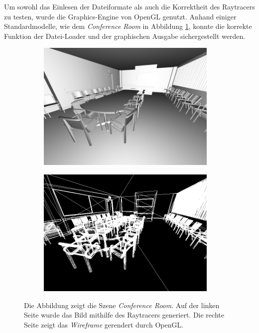 \documentclass[crop=false]{standalone}
\begin{document}
      Um sowohl das Einlesen der Dateiformate als auch die Korrektheit des Raytracers zu testen, wurde die Graphics-Engine von OpenGL genutzt.
      Anhand einiger Standardmodelle, wie dem \textit{Conference Room} in Abbildung \ref{fig:raytracer-example}, konnte die korrekte Funktion der Datei-Loader und der graphischen Ausgabe sichergestellt werden.
      \begin{figure}
        \center
        \begin{subfigure}[b]{0.49\textwidth}
          \center
          \includegraphics[width=0.95\textwidth]{images/ray_tracer_example.png}
        \end{subfigure}
        \begin{subfigure}[b]{0.49\textwidth}
          \center
          \includegraphics[width=0.95\textwidth]{images/opengl_example.png}
        \end{subfigure}
        \caption{%
          Die Abbildung zeigt die Szene \textit{Conference Room}.
          Auf der linken Seite wurde das Bild mithilfe des Raytracers generiert.
          Die rechte Seite zeigt das \textit{Wireframe} gerendert durch OpenGL.
        }
        \label{fig:raytracer-example}
      \end{figure}
\end{document}
